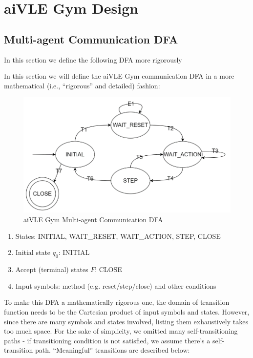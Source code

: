 \chapter{aiVLE Gym Design}
\label{appendix:aivle-gym}
\section{Multi-agent Communication DFA}
\label{as:aivle-gym_dfa}

In this section we define the following DFA more rigorously 

In this section we will define the aiVLE Gym communication DFA in a more mathematical (i.e., ``rigorous'' and detailed) fashion:

\begin{figure}[H]
    \centering
    \includegraphics{images/aivle-gym-multi-dfa.png}
    \caption{aiVLE Gym Multi-agent Communication DFA}
    \label{fig:aivle-gym_dfa}
\end{figure}

\begin{enumerate}
    \item States: INITIAL, WAIT\_RESET, WAIT\_ACTION, STEP, CLOSE
    \item Initial state $q_0$: INITIAL
    \item Accept (terminal) states $F$: CLOSE
    \item Input symbols: method (e.g. reset/step/close) and other conditions
\end{enumerate}

To make this DFA a mathematically rigorous one, the domain of transition function needs to be the Cartesian product of input symbols and states. However, since there are many symbols and states involved, listing them exhaustively takes too much space. For the sake of simplicity, we omitted many self-transitioning paths - if transitioning condition is not satisfied, we assume there's a self-transition path. ``Meaningful'' transitions are described below:

